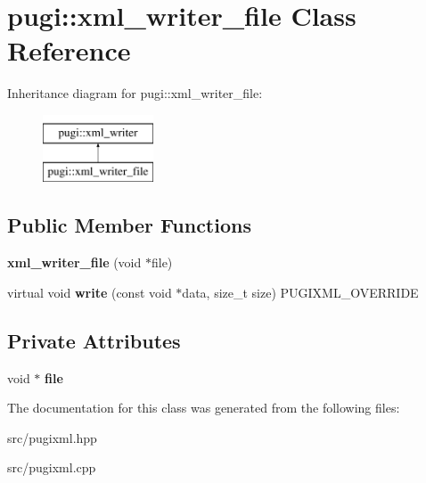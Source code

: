 \hypertarget{classpugi_1_1xml__writer__file}{}\section{pugi\+:\+:xml\+\_\+writer\+\_\+file Class Reference}
\label{classpugi_1_1xml__writer__file}
Inheritance diagram for pugi\+:\+:xml\+\_\+writer\+\_\+file\+:\begin{figure}[H]
\begin{center}
\leavevmode
\includegraphics[height=2.000000cm]{classpugi_1_1xml__writer__file}
\end{center}
\end{figure}
\subsection*{Public Member Functions}
\begin{DoxyCompactItemize}
\item 
\mbox{\label{classpugi_1_1xml__writer__file_a458afaf5231f88e182fa16b13fc2b0a6}} 
{\bfseries xml\+\_\+writer\+\_\+file} (void $\ast$file)
\item 
\mbox{\label{classpugi_1_1xml__writer__file_af89c557be2a43f11836f1f4db50855e6}} 
virtual void {\bfseries write} (const void $\ast$data, size\+\_\+t size) P\+U\+G\+I\+X\+M\+L\+\_\+\+O\+V\+E\+R\+R\+I\+DE
\end{DoxyCompactItemize}
\subsection*{Private Attributes}
\begin{DoxyCompactItemize}
\item 
\mbox{\label{classpugi_1_1xml__writer__file_af931f4d5628813f8661704d7e8be25e6}} 
void $\ast$ {\bfseries file}
\end{DoxyCompactItemize}


The documentation for this class was generated from the following files\+:\begin{DoxyCompactItemize}
\item 
src/pugixml.\+hpp\item 
src/pugixml.\+cpp\end{DoxyCompactItemize}
